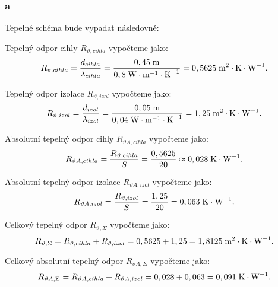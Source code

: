 \documentclass{article}
\begin{document}
\subsubsection{a}
Tepelné schéma bude vypadat následovně:
\begin{center}
\end{center}

Tepelný odpor cihly $R_{\vartheta,cihla}$ vypočteme jako:
$$
    R_{\vartheta,cihla} = \frac{d_{cihla}}{\lambda_{cihla}} = \frac{0,45 \; \textrm{m}}{0,8 \; \textrm{W} \cdot \textrm{m}^{-1} \cdot \textrm{K}^{-1}} = 0,5625 \; \textrm{m}^{\textrm{2}} \cdot \textrm{K} \cdot \textrm{W}^{-1}.
$$

Tepelný odpor izolace $R_{\vartheta,izol}$ vypočteme jako:
$$
    R_{\vartheta,izol} = \frac{d_{izol}}{\lambda_{izol}} = \frac{0,05 \; \textrm{m}}{0,04 \; \textrm{W} \cdot \textrm{m}^{-1} \cdot \textrm{K}^{-1}} = 1,25 \; \textrm{m}^{\textrm{2}} \cdot \textrm{K} \cdot \textrm{W}^{-1}.
$$

Absolutní tepelný odpor cihly $R_{\vartheta A,cihla}$ vypočteme jako:
$$
    R_{\vartheta A,cihla} = \frac{R_{\vartheta,cihla}}{S} = \frac{0,5625}{20} \approx 0,028 \; \textrm{K} \cdot \textrm{W}^{-1}.
$$

Absolutní tepelný odpor izolace $R_{\vartheta A,izol}$ vypočteme jako:
$$
    R_{\vartheta A,izol} = \frac{R_{\vartheta,izol}}{S} = \frac{1,25}{20} = 0,063 \; \textrm{K} \cdot \textrm{W}^{-1}.
$$

Celkový tepelný odpor $R_{\vartheta,\Sigma}$ vypočteme jako:
$$
    R_{\vartheta,\Sigma} = R_{\vartheta,cihla} + R_{\vartheta,izol} = 0,5625 + 1,25 = 1,8125 \; \textrm{m}^{\textrm{2}} \cdot \textrm{K} \cdot \textrm{W}^{-1}.
$$

Celkový absolutní tepelný odpor $R_{\vartheta A,\Sigma}$ vypočteme jako:
$$
    R_{\vartheta A,\Sigma} = R_{\vartheta A,cihla} + R_{\vartheta A,izol} = 0,028 + 0,063 = 0,091 \; \textrm{K} \cdot \textrm{W}^{-1}.
$$
\end{document}
